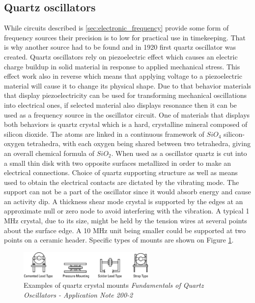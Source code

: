 \subsection{Quartz oscillators}
\FloatBarrier
While circuits described is \ref{sec:electronic_frequency} provide some form of frequency sources
their precision is to low for practical use in timekeeping. 
That is why another source had to be found and in 1920 first quartz oscillator was created.
Quartz oscillators rely on piezoelectric effect which causes an electric charge buildup in 
solid material in response to applied mechanical stress. This effect work also in reverse which
means that applying voltage to a piezoelectric material will cause it to change its physical
shape. Due to that behavior materials that display piezoelectricity can be used for transforming
mechanical oscillations into electrical ones, if selected material also displays resonance then
it can be used as a frequency source in the oscillator circuit.
One of materials that displays both behaviors is quartz crystal which is a hard, crystalline 
mineral composed of silicon dioxide. 
The atoms are linked in a continuous framework of $SiO_{4}$ silicon-oxygen tetrahedra,
with each oxygen being shared between two tetrahedra, giving an overall chemical formula 
of $SiO_{2}$.
When used as a oscillator quartz is cut into a small thin disk with two opposite surfaces 
metallized in order to make an electrical connections.
Choice of quartz supporting structure as well as means used to obtain the electrical contacts 
are dictated by the vibrating mode. The support can not be a part of the oscillator since it 
would absorb energy and cause an activity dip. A thickness shear mode crystal is supported by
the edges at an approximate null or zero node to avoid interfering with the vibration.
A typical 1 MHz crystal, due to its size, might be held by the tension wires at several points
about the surface edge. A 10 MHz unit being smaller could be supported at two points on 
a ceramic header. Specific types of mounts are shown on Figure \ref{fig:quartz_mount}.
\begin{figure}[htb] 
	\label{fig:quartz_mount}
	\centering
	\includegraphics[width=0.6\textwidth]{figures/quartz_mounts}
	\caption{Examples of quartz crystal mounts \textit{Fundamentals  of 
	Quartz  Oscillators - Application  Note  200-2}}
\end{figure}
